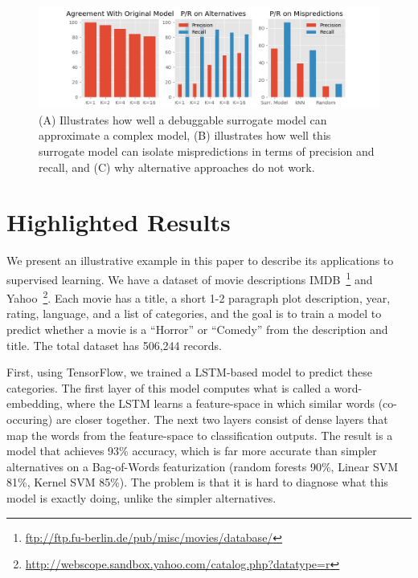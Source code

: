 
\begin{figure}[ht]
    \centering
    \includegraphics[width=\textwidth]{figures/result1.png}
    \caption{(A) Illustrates how well a debuggable surrogate model can approximate a complex model, (B) illustrates how well this surrogate model can isolate mispredictions in terms of precision and recall, and (C) why alternative approaches do not work.}
    \label{fig:teaser}
\end{figure}

\section{Highlighted Results}
We present an illustrative example in this paper to describe its applications to supervised learning.
We have a dataset of movie descriptions IMDB~\footnote{ \url{ftp://ftp.fu-berlin.de/pub/misc/movies/database/}} and Yahoo~\footnote{ \url{http://webscope.sandbox.yahoo.com/catalog.php?datatype=r}}.
Each movie has a title, a short 1-2 paragraph plot description, year, rating, language, and a list of categories, and the goal is to train a model to predict whether a movie is a ``Horror'' or ``Comedy'' from the description and title.  
The total dataset has 506,244 records.

First, using TensorFlow, we trained a LSTM-based model to predict these categories. The first layer of this model computes what is called a word-embedding, where the LSTM learns a feature-space in which similar words (co-occuring) are closer together. 
The next two layers consist of dense layers that map the words from the feature-space to classification outputs.
The result is a model that achieves 93\% accuracy, which is far more accurate than simpler alternatives on a Bag-of-Words featurization (random forests 90\%, Linear SVM 81\%, Kernel SVM 85\%).
The problem is that it is hard to diagnose what this model is exactly doing, unlike the simpler alternatives. 


